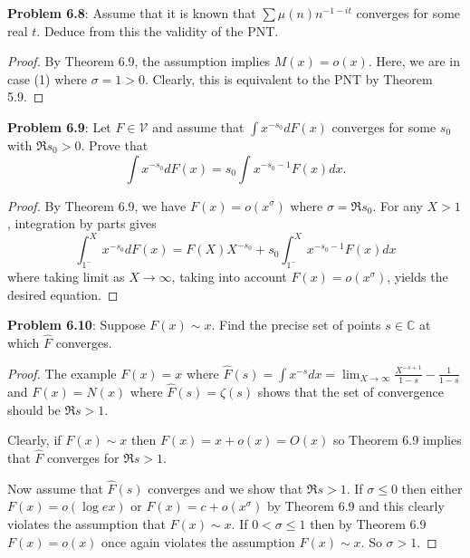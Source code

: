 \documentclass[12pt]{article}
\newcommand{\C}{\mathbb{C}}
\newcommand{\V}{\mathcal{V}}
\newcommand{\Fhat}{\widehat{F}}
\begin{document}
\fi

\textbf{Problem 6.8}: Assume that it is known that $\sum \mu(n) n^{-1-it}$ converges for some real $t$. Deduce from this the validity of the PNT.

\begin{proof}
By Theorem 6.9, the assumption implies $M(x) = o(x)$. Here, we are in case (1) where $\sigma = 1 > 0$. Clearly, this is equivalent to the PNT by Theorem 5.9.
\end{proof}

\textbf{Problem 6.9}: Let $F \in \V$ and assume that $\int x^{-s_0} dF(x)$ converges for some $s_0$ with $\Re s_0 > 0$. Prove that
$$\int x^{-s_0} dF(x) = s_0 \int x^{-s_0-1} F(x) dx.$$

\begin{proof}
By Theorem 6.9, we have $F(x) = o(x^\sigma)$ where $\sigma = \Re s_0$. For any $X > 1$, integration by parts gives
$$\int_{1^-}^X x^{-s_0} dF(x) = F(X) X^{-s_0} + s_0 \int_{1^-}^X x^{-s_0-1} F(x) dx$$
where taking limit as $X \rightarrow \infty$, taking into account $F(x) = o(x^{\sigma})$, yields the desired equation.
\end{proof}

\textbf{Problem 6.10}: Suppose $F(x) \sim x$. Find the precise set of points $s \in \C$ at which $\Fhat$ converges.

\begin{proof}
The example $F(x) = x$ where $\Fhat(s) = \int x^{-s} dx = \lim_{X \rightarrow \infty} \frac{X^{-s + 1}}{1 - s} - \frac{1}{1 - s}$ and $F(x) = N(x)$ where $\Fhat(s) = \zeta(s)$ shows that the set of convergence should be $\Re s > 1$.

Clearly, if $F(x) \sim x$ then $F(x) = x + o(x) = O(x)$ so Theorem 6.9 implies that $\Fhat$ converges for $\Re s > 1$.

Now assume that $\Fhat(s)$ converges and we show that $\Re s > 1$. If $\sigma \leq 0$ then either $F(x) = o(\log ex)$ or $F(x) = c + o(x^\sigma)$ by Theorem 6.9 and this clearly violates the assumption that $F(x) \sim x$. If $0 < \sigma \leq 1$ then by Theorem 6.9 $F(x) = o(x)$ once again violates the assumption $F(x) \sim x$. So $\sigma > 1$.
\end{proof}

\unless\ifdefined\IsMainDocument
\end{document}
